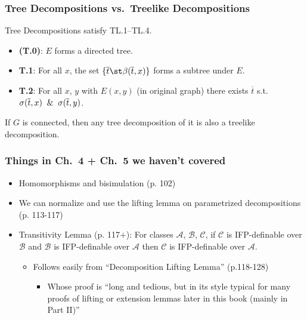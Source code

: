 \documentclass{beamer}
\begin{document}
\begin{frame}
  \frametitle{Tree Decompositions vs.\ Treelike Decompositions}
  Tree Decompositions satisfy TL.1--TL.4.
  \begin{itemize}
  \item \textbf{(T.0)}: $E$ forms a directed tree.
  \item \textbf{T.1}: For all $x$, the set $\{ \overline{t} \st
    \beta(\overline{t}, x)\}$ forms a subtree under $E$.
  \item \textbf{T.2}: For all $x$, $y$ with $E(x, y)$ (in original graph)
    there exists $\overline{t}$ s.t. $\sigma(\overline{t}, x) \And
    \sigma(\overline{t}, y)$.
  \end{itemize}
  \pause
  If $G$ is connected, then any tree decomposition of it is also a treelike decomposition.
\end{frame}

\begin{frame}
  \frametitle{Things in Ch.\ 4 + Ch.\ 5 we haven't covered}
  \begin{itemize}
  \item Homomorphisms and bisimulation (p. 102)
    \pause
  \item We can normalize and use the lifting lemma on parametrized
    decompositions (p. 113-117)
    \pause
  \item Transitivity Lemma (p. 117$+$): For classes $\mathcal{A}$,
    $\mathcal{B}$, $\mathcal{C}$, if $\mathcal{C}$ is IFP-definable over
    $\mathcal{B}$ and $\mathcal{B}$ is IFP-definable over $\mathcal{A}$
    then $\mathcal{C}$ is IFP-definable over $\mathcal{A}$.
    \begin{itemize}
    \item Follows easily from ``Decomposition Lifting Lemma'' (p.118-128)
      \begin{itemize}
      \item Whose proof is ``long and tedious, but in its style typical for
        many proofs of lifting or extension lemmas later in this book
        (mainly in Part II)''  
      \end{itemize}
    \end{itemize}
  \end{itemize}
\end{frame}


\end{document}
